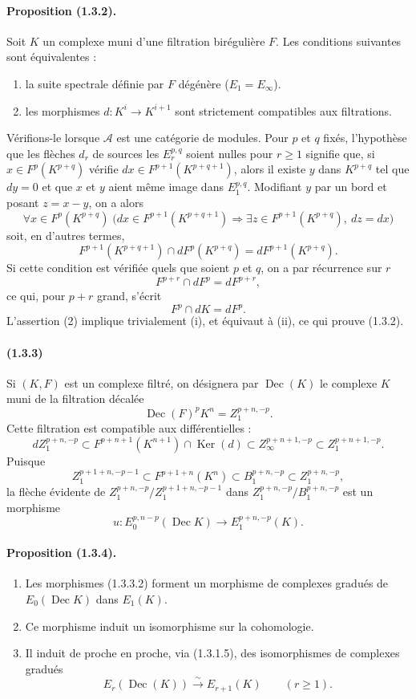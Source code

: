 \documentclass[10pt]{article}
\newcommand{\Ker}{\operatorname{Ker}}
\newcommand{\calA}{\mathcal A}
\newcommand{\iso}{\xrightarrow{\sim}}
\newcommand{\Dec}{\operatorname{Dec}}
\begin{document}
\paragraph{Proposition (1.3.2).} Soit $K$ un complexe muni d'une filtration birégulière $F$. Les conditions suivantes sont équivalentes :
\begin{enumerate}[label=(\roman*)]
\item la suite spectrale définie par $F$ dégénère ($E_1=E_\infty$).
\item les morphismes $d:K^i\to K^{i+1}$ sont strictement compatibles aux filtrations.
\end{enumerate}
Vérifions-le lorsque $\calA$ est une catégorie de modules. Pour $p$ et $q$ fixés, l'hypothèse que les flèches $d_r$ de sources les $E_r^{p,q}$ soient nulles pour $r\geq 1$ signifie que, si $x\in F^p(K^{p+q})$ vérifie $dx\in F^{p+1}(K^{p+q+1})$, alors il existe $y$ dans $K^{p+q}$ tel que $dy=0$ et que $x$ et $y$ aient même image dans $E_1^{p,q}$. Modifiant $y$ par un bord et posant $z=x-y$, on a alors
\[
\forall x\in F^p(K^{p+q})\;\bigl(dx\in F^{p+1}(K^{p+q+1})\Rightarrow
\exists z\in F^{p+1}(K^{p+q}),\ dz=dx\bigr)
\]
soit, en d'autres termes,
\[
\tag{1}
F^{p+1}(K^{p+q+1})\cap dF^p(K^{p+q})=dF^{p+1}(K^{p+q}).
\]
Si cette condition est vérifiée quels que soient $p$ et $q$, on a par récurrence sur $r$
\[
F^{p+r}\cap dF^p=dF^{p+r},
\]
ce qui, pour $p+r$ grand, s'écrit
\[
\tag{2}
F^p\cap dK=dF^p.
\]
L'assertion (2) implique trivialement (i), et équivaut à (ii), ce qui prouve (1.3.2).

\paragraph{(1.3.3)} Si $(K,F)$ est un complexe filtré, on désignera par $\Dec(K)$ le complexe $K$ muni de la filtration décalée
\[
\Dec(F)^pK^n=Z_1^{p+n,-p}.
\]
Cette filtration est compatible aux différentielles :
\[
dZ_1^{p+n,-p}\subset F^{p+n+1}(K^{n+1})\cap\Ker(d)
       \subset Z_\infty^{p+n+1,-p}\subset Z_1^{p+n+1,-p}.
\]
Puisque
\[
\tag{1.3.3.1}
Z_1^{p+1+n,-p-1}\subset F^{p+1+n}(K^n)\subset B_1^{p+n,-p}\subset Z_1^{p+n,-p},
\]
la flèche évidente de $Z_1^{p+n,-p}/Z_1^{p+1+n,-p-1}$ dans $Z_1^{p+n,-p}/B_1^{p+n,-p}$ est un morphisme
\[
\tag{1.3.3.2}
u:E_0^{p,n-p}(\Dec K)\longrightarrow E_1^{p+n,-p}(K).
\]

\paragraph{Proposition (1.3.4).}
\begin{enumerate}[label=(\roman*)]
\item Les morphismes (1.3.3.2) forment un morphisme de complexes gradués de $E_0(\Dec K)$ dans $E_1(K)$.
\item Ce morphisme induit un isomorphisme sur la cohomologie.
\item Il induit de proche en proche, via (1.3.1.5), des isomorphismes de complexes gradués
\[
E_r(\Dec(K))\iso E_{r+1}(K)\qquad(r\ge1).
\]
\end{enumerate}
\end{document}
